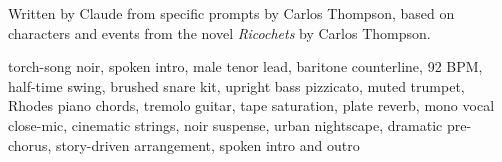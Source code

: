 
\begin{notes}
Written by Claude from specific prompts by Carlos Thompson, based on characters and events from the novel \emph{Ricochets} by Carlos Thompson.
\end{notes}
\begin{style}
torch-song noir, spoken intro, male tenor lead, baritone counterline, 92 BPM, half-time swing, brushed snare kit, upright bass pizzicato, muted trumpet, Rhodes piano chords, tremolo guitar, tape saturation, plate reverb, mono vocal close-mic, cinematic strings, noir suspense, urban nightscape, dramatic pre-chorus, story-driven arrangement, spoken intro and outro
\end{style}

